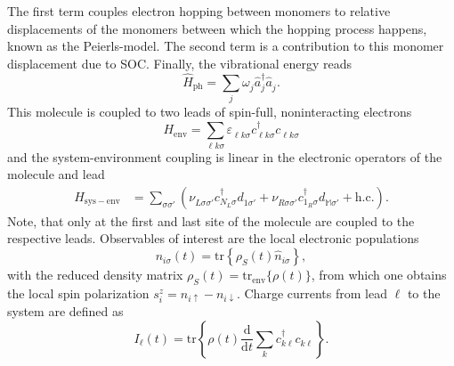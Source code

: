 \documentclass{article}
\newcommand{\dif}{\mathrm{d}}
\newcommand{\pdagger}{{\phantom{\dagger}}}
\newcommand{\tr}[1]{\mathrm{tr}\left\{#1\right\}}
\begin{document}
The first term couples electron hopping between monomers to relative displacements of the monomers between which the hopping process happens, known as the Peierls-model. The second term is a contribution to this monomer displacement due to SOC. Finally, the vibrational energy reads 
\begin{equation}
	\hat{H}_\mathrm{ph} = \sum_{j} \omega_{j}^\pdagger \hat{a}_{j}^\dagger \hat{a}_{j}^\pdagger.
	\label{eq:HPh} 
\end{equation}
This molecule is coupled to two leads of spin-full, noninteracting electrons
\begin{equation}
	H_\mathrm{env} = \sum_{\ell k\sigma} \varepsilon_{\ell k\sigma}^\pdagger c_{\ell k\sigma}^\dagger c_{\ell k\sigma}^\pdagger \label{eq:LeadHamiltonian}
\end{equation}
and the system-environment coupling is linear in the electronic operators of the molecule and lead
\begin{align}
	H_\mathrm{sys-env} &= \sum_{\sigma\sigma'}(\nu_{L\sigma\sigma'}^\pdagger c_{N_L\sigma}^\dagger d_{1\sigma'}^\pdagger + \nu_{R\sigma\sigma'}^\pdagger c_{1_R\sigma}^\dagger d_{\mathbb{M}\sigma'}^\pdagger + \mathrm{h.c.}). \label{eq:LeadSysHamiltonian}
\end{align} 
Note, that only at the first and last site of the molecule are coupled to the respective leads. Observables of interest are the local electronic populations
\begin{equation}
	n_{i\sigma}(t) = \tr{\rho_S(t) \hat{n}_{i\sigma}},
\end{equation}
with the reduced density matrix $\rho_S(t) = \mathrm{tr}_\mathrm{env}\{\rho(t)\}$, from which one obtains the local spin polarization $s^z_i = n_{i\uparrow}-n_{i\downarrow}$. Charge currents from lead $\ell$ to the system are defined as
\begin{equation}
	I_\ell(t) = \tr{\rho(t) \frac{\dif}{\dif t}\sum_k c^\dagger_{k\ell}c^\pdagger_{k\ell}}.
\end{equation}
\end{document}
